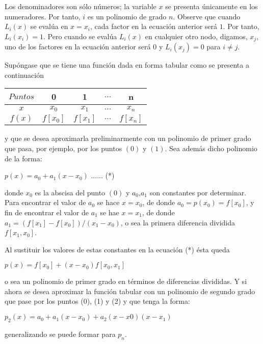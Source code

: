 \documentclass[10pt,a4paper]{article}
\begin{document}
\begin{multicols}{2}
\noindent Los denominadores son sólo números; la variable $x$ se presenta únicamente en los numeradores. Por tanto, $i$ es un polinomio de grado $n$. Observe que cuando $L_i(x)$ se evalúa en $x = x_i$, cada factor en la ecuación anterior será $1$. Por tanto, $L_i(x_i) = 1$. Pero cuando se evalúa $L_i(x)$ en cualquier otro nodo, digamos, $x_j$, uno de los factores en la ecuación anterior será $0$ y $L_i(x_j) = 0$ para $i \not= j$.
\vspace*{0.2cm}


\vspace*{0.2cm}

\noindent Supóngase que se tiene una función dada en forma tabular como se presenta a continuación

\begin{center}
	\begin{tabular}{ c|c|c|c|c }
		\hline
		$Puntos$ & 0 & 1 & $...$ & n\\ \hline
		$x$ & $x_0$ & $x_1$ & $...$ & $x_n$  \\
		$f(x)$ & $f[x_0]$ & $f[x_1]$  &$...$ & $f[x_n]$ \\ \hline
		
	\end{tabular}
\end{center}

y que se desea aproximarla preliminarmente con un polinomio de primer grado que pasa, por ejemplo, por los puntos $(0)$ y $(1)$. Sea además dicho polinomio de la forma:
\begin{center}
	$p(x) = a_0 + a_1(x-x_0)$ ...... (*)
\end{center}
donde $x_0$ es la abscisa del punto $(0)$ y $a_0$,$a_1$ son constantes por determinar. Para encontrar el valor de $a_0$ se hace $x=x_0$, de donde $a_0 = p(x_0) = f[x_0]$, y fin de encontrar el valor de $a_1$ se hae $x = x_1$, de donde $a_1 = (f[x_1]-f[x_0])/(x_1-x_0)$, o sea la primera diferencia dividida $f[x_1,x_0]$.

Al sustituir los valores de estas constantes en la ecuación (*) ésta queda
\begin{center}
	$p(x) = f[x_0] + (x - x_0)f[x_0,x_1]$
\end{center}
o sea un polinomio de primer grado en términos de diferencias divididas.
Y si ahora se desea aproximar la función tabular con un polinomio de segundo grado que pase por los puntos (0), (1) y (2) y que tenga la forma:
\begin{center}
	$p_2(x) = a_0 + a_1(x-x_0) + a_2(x-x0)(x-x_1)$
\end{center}
generalizando se puede formar para $p_n$.


\end{multicols}
\end{document}
